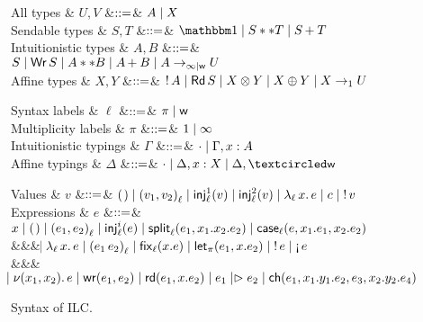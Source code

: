 \begin{figure*}[t]
  \centering
  \begin{minipage}{.58\textwidth}
    \centering
    \begin{grammar}
        All types
      & $U, V$
        &$\bnfas$& $A \bnfalt X$
      \\
      Sendable types
      & $S, T$
      &$\bnfas$& $\tyUnit \bnfalt S ** T \bnfalt \tySum{S}{}{T}$
      \\
      Intuitionistic types
      & $A,B$
      &$\bnfas$& $S \bnfalt \tyWr{S} \bnfalt A ** B \bnfalt \tySum{A}{}{B}
      \bnfalt \tyArr{A}{\infty \mid \wm}{U}$
      \\
      Affine types
      & $X,Y$
      &$\bnfas$& $\tyBang{A} \bnfalt \tyRd{S} \bnfalt \tyTensor{X}{Y} \bnfalt
      \tyOplus{X}{Y} \bnfalt \tyArr{X}{1}{U}$
    \end{grammar}      
  \end{minipage}%
  \begin{minipage}{.42\textwidth}
    \centering
    \begin{grammar}
      Syntax labels
      & $\ell$
      &$\bnfas$& $\pi \bnfalt \wm$      
      \\      
      Multiplicity labels
      & $\pi$
      &$\bnfas$& $1 \bnfalt \infty$      
      \\
      Intuitionistic typings
      & $\Gamma$
      &$\bnfas$& $\emptyctxt \bnfalt \Gamma,x:A$
      \\
      Affine typings
      & $\Delta$
      &$\bnfas$& $\emptyctxt \bnfalt \Delta,x:X \bnfalt \Delta, \wrtok$
    \end{grammar}    
  \end{minipage}
  \begin{grammar}
    Values
    & $v$
    &$\bnfas$&
    $\eUnit \bnfalt \ePair{v_1}{v_2}{\ell} \bnfalt \eInjj{\ell}{1}{v} \bnfalt
    \eInjj{\ell}{2}{v} \bnfalt \eLamm{\ell}{x}{e} \bnfalt c \bnfalt \eBang{v}$
    \\
    Expressions
    & $e$
    &$\bnfas$&
    $\eVar{x} \bnfalt \eUnit \bnfalt \ePair{e_1}{e_2}{\ell} \bnfalt \eInjj{\ell}{i}{e}
    \bnfalt \eSplitt{\ell}{e_1}{x_1}{x_2}{e_2} \bnfalt
    \eCase{\ell}{e}{x_1}{e_1}{x_2}{e_2}$
    \\ &&& $\bnfaltbrk \eLamm{\ell}{x}{e} \bnfalt \eApp{e_1}{e_2}{\ell} \bnfalt \eFixx{\ell}{x}{e}
    \bnfalt \eLet{x}{e_1}{e_2} \bnfalt \eBang{e} \bnfalt \eUnbang{e}$
    \\ &&& $\bnfaltbrk \eNu{(x_1,x_2)}{e} \bnfalt \eWr{e_1}{e_2} \bnfalt
    \eLetRd{e_1}{x}{e_2} \bnfalt \eFork{e_1}{e_2} \bnfalt \eChoicee{e_1}{x_1}{y_1}{e_2}{e_3}{x_2}{y_2}{e_4}$
  \end{grammar}      
  \caption{Syntax of ILC.}
  \label{fig:ilc-syntax}
\end{figure*}
